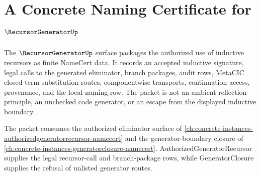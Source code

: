 \chapter{A Concrete Naming Certificate for $\RecursorGeneratorUp$}
\label{ch:concrete-instances-recursorgenerator-namecert}

The $\RecursorGeneratorUp$ surface packages the authorized use of inductive recursors as finite NameCert data. It records an accepted inductive signature, legal calls to the generated eliminator, branch packages, audit rows, MetaCIC closed-term substitution routes, componentwise transports, continuation access, provenance, and the local naming row. The packet is not an ambient reflection principle, an unchecked code generator, or an escape from the displayed inductive boundary.

The packet consumes the authorized eliminator surface of \autoref{ch:concrete-instances-authorizedgeneratorrecursor-namecert} and the generator-boundary closure of \autoref{ch:concrete-instances-generatorclosure-namecert}. AuthorizedGeneratorRecursor supplies the legal recursor-call and branch-package rows, while GeneratorClosure supplies the refusal of unlisted generator routes.

